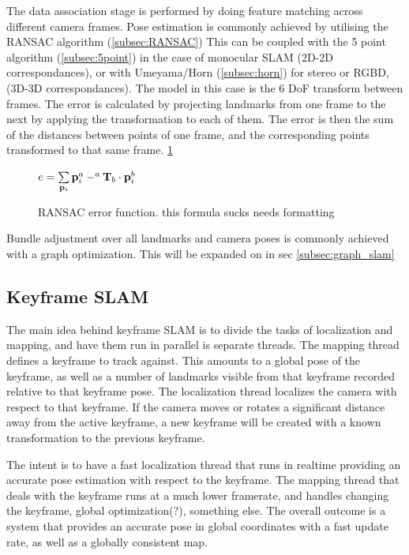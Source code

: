 The data association stage is performed by doing feature matching across different camera frames. Pose estimation is commonly achieved by utilising the RANSAC algorithm (\ref{subsec:RANSAC}) This can be coupled with the 5 point algorithm (\ref{subsec:5point}) in the case of monocular SLAM (2D-2D correspondances), or with Umeyama/Horn (\ref{subsec:horn}) for stereo or RGBD, (3D-3D correspondances). The model in this case is the 6 DoF transform between frames. The error is calculated by projecting landmarks from one frame to the next by applying the transformation to each of them. The error is then the sum of the distances between points of one frame, and the corresponding points transformed to that same frame. \ref{eq:ransac_error}

\begin{figure}
 \centering
 \begin{math}
  e = \sum\limits_{\mathbf p_i} \mathbf p^a_i - ^a\mathbf T_b \cdot \mathbf p^b_i
 \end{math}
 \caption{RANSAC error function.  this formula sucks needs formatting}
 \label{eq:ransac_error}
\end{figure}

Bundle adjustment over all landmarks and camera poses is commonly achieved with a graph optimization. This will be expanded on in sec \ref{subsec:graph_slam}

\subsection{Keyframe SLAM}

The main idea behind keyframe SLAM is to divide the tasks of localization and mapping, and have them run in parallel is separate threads.  The mapping thread defines a keyframe to track against. This amounts to a global pose of the keyframe, as well as a number of landmarks visible from that keyframe recorded relative to that keyframe pose.  The localization thread localizes the camera with respect to that keyframe.  If the camera moves or rotates a significant distance away from the active keyframe, a new keyframe will be created with a known transformation to the previous keyframe.

The intent is to have a fast localization thread that runs in realtime providing an accurate pose estimation with respect to the keyframe.  The mapping thread that deals with the keyframe runs at a much lower framerate, and handles changing the keyframe, global optimization(?), something else. The overall outcome is a system that provides an accurate pose in global coordinates with a fast update rate, as well as a globally consistent map.

